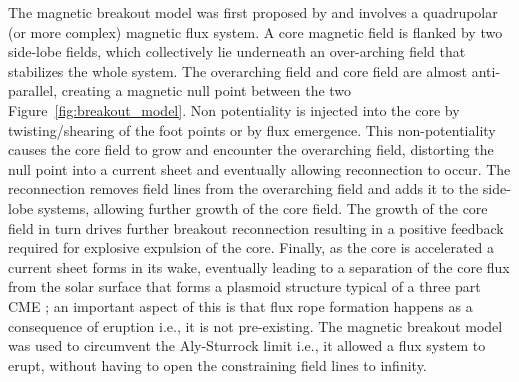 The magnetic breakout model was first proposed by \citep{antiochos1999} and involves a quadrupolar (or more complex) magnetic flux system. A core magnetic field is flanked by two side-lobe fields, which collectively lie underneath an over-arching field that stabilizes the whole system. The overarching field and core field are almost anti-parallel, creating a magnetic null point between the two Figure~\ref{fig:breakout_model}. Non potentiality is injected into the core by twisting/shearing of the foot points or by flux emergence. This non-potentiality causes the core field to grow and encounter the overarching field, distorting the null point into a current sheet and eventually allowing reconnection to occur. The reconnection removes field lines from the overarching field and adds it to the side-lobe systems, allowing further growth of the core field. The growth of the core field in turn drives further breakout reconnection resulting in a positive feedback required for explosive expulsion of the core. Finally, as the core is accelerated a current sheet forms in its wake, eventually leading to a separation of the core flux from the solar surface that forms a plasmoid structure typical of a three part CME \citep{lynch2004}; an important aspect of this is that flux rope formation happens as a consequence of eruption i.e., it is not pre-existing. The magnetic breakout model was used to circumvent the Aly-Sturrock limit \citep{aly1991, sturrock1991} i.e., it allowed a flux system to erupt, without having to open the constraining field lines to infinity.
